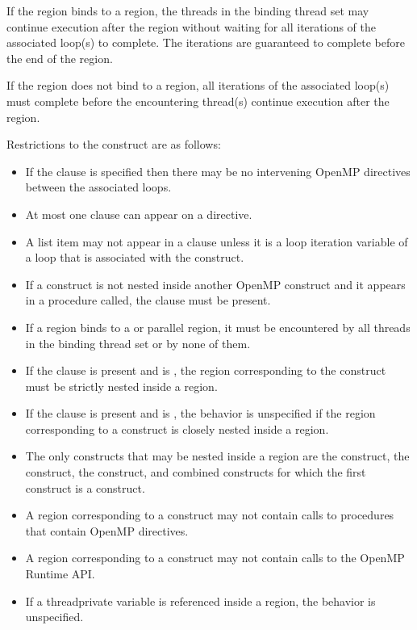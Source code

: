 If the  region binds to a  region, the threads in the
binding thread set may continue execution after the  region without
waiting for all iterations of the associated loop(s) to complete. The
iterations are guaranteed to complete before the end of the  region.

If the  region does not bind to a  region, all
iterations of the associated loop(s) must complete before the encountering
thread(s) continue execution after the  region.

\restrictions
Restrictions to the  construct are as follows:

\begin{itemize}
\item If the  clause is specified then there may be no intervening 
      OpenMP directives between the associated loops.
\item At most one  clause can appear on a  directive.
\item A list item may not appear in a  clause unless it
      is a loop iteration variable of a loop that is associated with the
      construct.
\item If a  construct is not nested inside another OpenMP
      construct and it appears in a procedure called, the
       clause must be present.
\item If a  region binds to a  or parallel
      region, it must be encountered by all threads in the binding thread set
      or by none of them.
\item If the  clause is present and  is ,
      the  region corresponding to the  construct must be
      strictly nested inside a  region.
\item If the  clause is present and  is ,
      the behavior is unspecified if the  region corresponding to a
       construct is closely nested inside a  region.
\item The only constructs that may be nested inside a  region
      are the  construct, the  construct, the
       construct, and combined constructs for which the first
      construct is a  construct.
\item A  region corresponding to a  construct may not
      contain calls to procedures that contain OpenMP directives. 
\item A  region corresponding to a  construct may not
      contain calls to the OpenMP Runtime API.
\item If a threadprivate variable is referenced inside a  region, 
      the behavior is unspecified.
\end{itemize}

